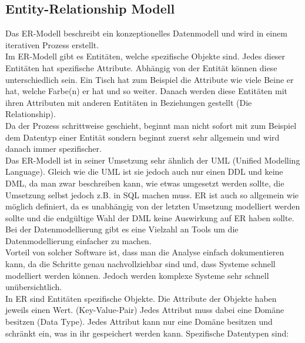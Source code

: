 \documentclass{article}
\begin{document}
	\subsection{Entity-Relationship Modell}
	Das ER-Modell beschreibt ein konzeptionelles Datenmodell und wird in einem iterativen Prozess erstellt. \\
	Im ER-Modell gibt es Entitäten, welche spezifische Objekte sind. Jedes dieser Entitäten hat spezifische Attribute. Abhängig von der Entität können diese unterschiedlich sein. Ein Tisch hat zum Beispiel die Attribute wie viele Beine er hat, welche Farbe(n) er hat und so weiter. Danach werden diese Entitäten mit ihren Attributen mit anderen Entitäten in Beziehungen gestellt (Die Relationship). \\
	Da der Prozess schrittweise geschieht, beginnt man nicht sofort mit zum Beispiel dem Datentyp einer Entität sondern beginnt zuerst sehr allgemein und wird danach immer spezifischer. \\
	Das ER-Modell ist in seiner Umsetzung sehr ähnlich der UML (Unified Modelling Language). Gleich wie die UML ist sie jedoch auch nur einen DDL und keine DML, da man zwar beschreiben kann, wie etwas umgesetzt werden sollte, die Umsetzung selbst jedoch z.B. in SQL machen muss. ER ist auch so allgemein wie möglich definiert, da es unabhängig von der letzten Umsetzung modelliert werden sollte und die endgültige Wahl der DML keine Auswirkung auf ER haben sollte. \\
	Bei der Datenmodellierung gibt es eine Vielzahl an Tools um die Datenmodellierung einfacher zu machen. \\
	Vorteil von solcher Software ist, dass man die Analyse einfach dokumentieren kann, da die Schritte genau nachvollziehbar sind und, dass Systeme schnell modelliert werden können. Jedoch werden komplexe Systeme sehr schnell unübersichtlich. \\
	In ER sind Entitäten spezifische Objekte. Die Attribute der Objekte haben jeweils einen Wert. (Key-Value-Pair) Jedes Attribut muss dabei eine Domäne besitzen (Data Type). Jedes Attribut kann nur eine Domäne besitzen und schränkt ein, was in ihr gespeichert werden kann. Spezifische Datentypen sind: \\
\end{document}
